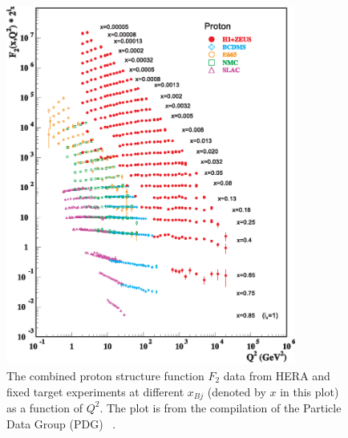 \begin{figure}
\centering
\includegraphics[width=0.85\textwidth]{plots/chpt2/f2collider_logf2.eps}
\caption[Combined proton structure function $F_{2}$ distribution from different experiments] {
The combined proton structure function $F_{2}$ data from HERA and fixed target experiments at different $x_{Bj}$ (denoted by $x$ in this plot) as a function of $Q^{2}$. The plot is from the compilation of the Particle Data Group (PDG) ~\cite{Beringer:1900zz}.}
\label{fig:F2_pdg}
\end{figure}

